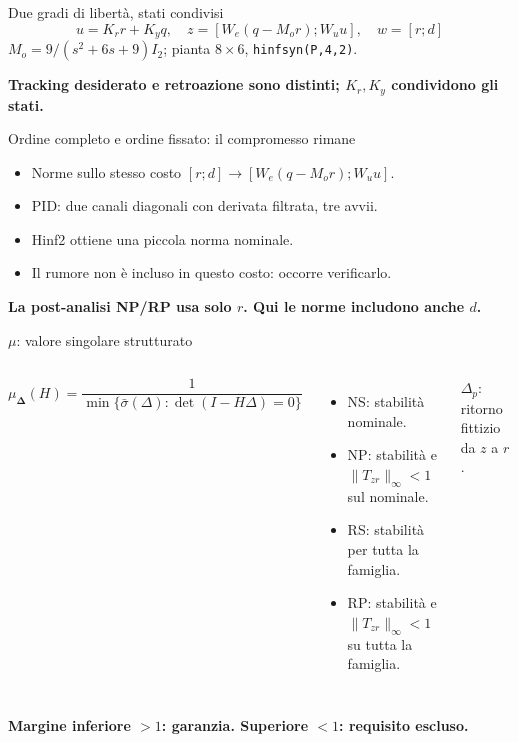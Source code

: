 \documentclass[aspectratio=169,12pt]{beamer}
\newcommand{\good}[1]{\textcolor{accent}{\textbf{#1}}}
\newcommand{\bad}[1]{\textcolor{warn}{\textbf{#1}}}
\begin{document}
\begin{frame}{Due gradi di libertà, stati condivisi}
\centering
\resizebox{.62\textwidth}{!}{}
\[u=K_rr+K_yq,\quad z=[W_e(q-M_or);W_uu],\quad w=[r;d]\]
\small $M_o=9/(s^2+6s+9)I_2$; pianta $8\times6$, \texttt{hinfsyn(P,4,2)}.
\par\medskip\good{Tracking desiderato e retroazione sono distinti; $K_r,K_y$ condividono gli stati.}
\end{frame}

\begin{frame}{Ordine completo e ordine fissato: il compromesso rimane}
\centering
\small
\begin{itemize}
\item Norme sullo stesso costo $[r;d]\to[W_e(q-M_or);W_uu]$.
\item PID: due canali diagonali con derivata filtrata, tre avvii.
\item Hinf2 ottiene una piccola norma nominale.
\item Il rumore non è incluso in questo costo: occorre verificarlo.
\end{itemize}
\bad{La post-analisi NP/RP usa solo $r$. Qui le norme includono anche $d$.}
\end{frame}



\begin{frame}{$\mu$: valore singolare strutturato}
\begin{columns}[T]
\small
\[\mu_{\boldsymbol\Delta}(H)=\frac{1}{\min\{\bar\sigma(\Delta):\det(I-H\Delta)=0\}}\]
\begin{itemize}
\item NS: stabilità nominale.
\item NP: stabilità e $\|T_{zr}\|_\infty<1$ sul nominale.
\item RS: stabilità per tutta la famiglia.
\item RP: stabilità e $\|T_{zr}\|_\infty<1$ su tutta la famiglia.
\end{itemize}
\begingroup\newcommand{\SeaDeltaLabel}{struttura A oppure B}
\resizebox{\linewidth}{!}{}\endgroup\par
\small $\Delta_p$: ritorno fittizio da $z$ a $r$.
\end{columns}
\medskip\good{Margine inferiore $>1$: garanzia. Superiore $<1$: requisito escluso.}
\end{frame}
\end{document}
